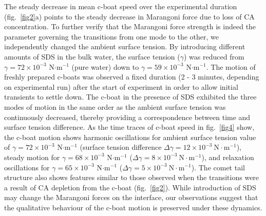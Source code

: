 \documentclass[journal=langd5, manuscript=article, layout=twocolumn]{achemso}
\begin{document}
The steady decrease in mean c-boat speed over the experimental duration (fig.~\ref{fig2}a) points to the steady decrease in Marangoni force due to loss of CA concentration. To further verify that the Marangoni force strength is indeed the parameter governing the transitions from one mode to the other, we independently changed the ambient surface tension. By introducing different amounts of SDS in the bulk water, the surface tension ($\gamma$) was reduced from $\gamma = 72\times 10^{-3}$ N$\cdot$m$^{-1}$ (pure water) down to $\gamma = 59\times 10^{-3}$ N$\cdot$m$^{-1}$. The motion of  freshly prepared c-boats was observed a fixed duration (2 - 3 minutes, depending on experimental run) after the start of experiment in order to allow initial transients to settle down. The c-boat in the presence of SDS exhibited the three modes of motion in the same order as the ambient surface tension was continuously decreased, thereby providing a correspondence between time and surface tension difference. As the time traces of c-boat speed in fig.~\ref{fig4} show, the c-boat motion shows harmonic oscillations for ambient surface tension value of $\gamma = 72\times 10^{-3}$ N$\cdot$m$^{-1}$ (surface tension difference $\Delta \gamma = 12 \times 10^{-3}~\text{N} \cdot \text{m}^{-1}$), steady motion for $\gamma = 68\times 10^{-3}$ N$\cdot$m$^{-1}$ ($\Delta \gamma = 8 \times 10^{-3}~\text{N} \cdot \text{m}^{-1}$), and relaxation oscillations for $\gamma = 65\times 10^{-3}$ N$\cdot$m$^{-1}$ ($\Delta \gamma = 5 \times 10^{-3}~\text{N} \cdot \text{m}^{-1}$). The comet tail structure also shows features similar to those observed when the transitions were a result of CA depletion from the c-boat (fig.~\ref{fig2}). While introduction of SDS may change the Marangoni forces on the interface, our observations suggest that the qualitative behaviour of the c-boat motion is preserved under these dynamics.
\end{document}
